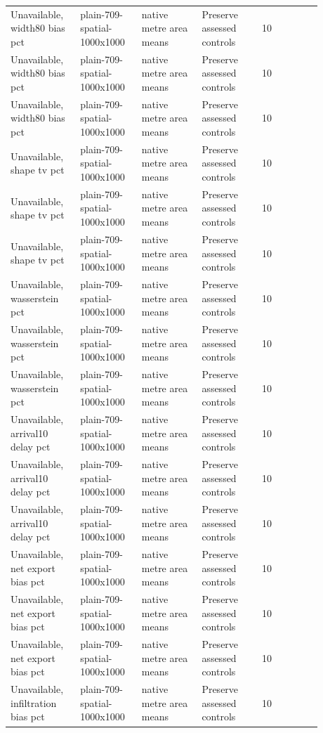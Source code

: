 \begin{longtable}{p{0.1760\linewidth}p{0.1760\linewidth}p{0.1760\linewidth}p{0.1760\linewidth}p{0.1760\linewidth}}
Unavailable, width80 bias pct & plain-709-spatial-1000x1000 & native metre area means & Preserve assessed controls & 10 \\
Unavailable, width80 bias pct & plain-709-spatial-1000x1000 & native metre area means & Preserve assessed controls & 10 \\
Unavailable, width80 bias pct & plain-709-spatial-1000x1000 & native metre area means & Preserve assessed controls & 10 \\
Unavailable, shape tv pct & plain-709-spatial-1000x1000 & native metre area means & Preserve assessed controls & 10 \\
Unavailable, shape tv pct & plain-709-spatial-1000x1000 & native metre area means & Preserve assessed controls & 10 \\
Unavailable, shape tv pct & plain-709-spatial-1000x1000 & native metre area means & Preserve assessed controls & 10 \\
Unavailable, wasserstein pct & plain-709-spatial-1000x1000 & native metre area means & Preserve assessed controls & 10 \\
Unavailable, wasserstein pct & plain-709-spatial-1000x1000 & native metre area means & Preserve assessed controls & 10 \\
Unavailable, wasserstein pct & plain-709-spatial-1000x1000 & native metre area means & Preserve assessed controls & 10 \\
Unavailable, arrival10 delay pct & plain-709-spatial-1000x1000 & native metre area means & Preserve assessed controls & 10 \\
Unavailable, arrival10 delay pct & plain-709-spatial-1000x1000 & native metre area means & Preserve assessed controls & 10 \\
Unavailable, arrival10 delay pct & plain-709-spatial-1000x1000 & native metre area means & Preserve assessed controls & 10 \\
Unavailable, net export bias pct & plain-709-spatial-1000x1000 & native metre area means & Preserve assessed controls & 10 \\
Unavailable, net export bias pct & plain-709-spatial-1000x1000 & native metre area means & Preserve assessed controls & 10 \\
Unavailable, net export bias pct & plain-709-spatial-1000x1000 & native metre area means & Preserve assessed controls & 10 \\
Unavailable, infiltration bias pct & plain-709-spatial-1000x1000 & native metre area means & Preserve assessed controls & 10 \\

\end{longtable}
